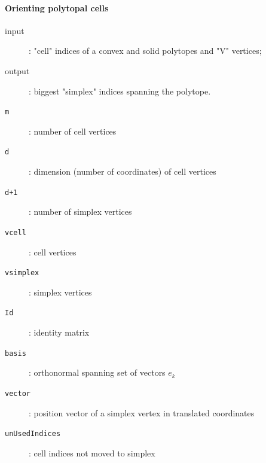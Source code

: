 \documentclass[11pt,oneside]{article}	%
\begin{document}
\paragraph{Orienting polytopal cells}
\begin{description}
	\item[input]:  "cell" indices of a convex and solid polytopes and "V" vertices;
	\item[output]:  biggest "simplex" indices spanning the polytope.
	\item[\tt m]: number of cell vertices
	\item[\tt d]: dimension (number of coordinates) of cell vertices
	\item[\tt d+1]: number of simplex vertices
	\item[\tt vcell]: cell vertices
	\item[\tt vsimplex]: simplex vertices
	\item[\tt Id]: identity matrix
	\item[\tt basis]: orthonormal spanning set of vectors $e_k$
	\item[\tt vector]: position vector of a simplex vertex in translated coordinates
	\item[\tt unUsedIndices]: cell indices not moved to simplex
\end{description}
\end{document}
